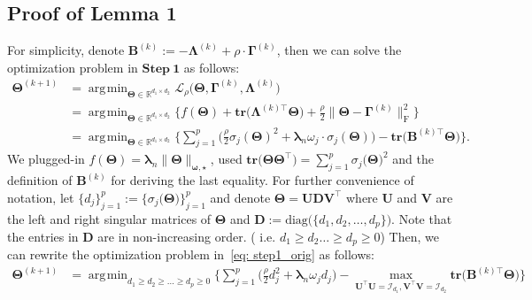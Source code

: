 \documentclass[alpha-refs]{wiley-article}
\DeclareMathOperator*{\argmin}{\arg\!\min}
\begin{document}
\subsection{Proof of Lemma 1}
For simplicity, denote $\boldsymbol{B}^{(k)}:=-\boldsymbol{\Lambda}^{(k)}+\rho \cdot \boldsymbol{\Gamma}^{(k)}$, then we can solve the optimization problem in $\textbf{Step}\ \boldsymbol{1}$ as follows:
\begin{align}
    \boldsymbol{\Theta}^{(k+1)}
    &= \argmin_{\boldsymbol{\Theta}\in\mathbb{R}^{d_{1} \times d_{2}}} \mathcal{L}_{\rho} \big( \boldsymbol{\Theta},\boldsymbol{\Gamma}^{(k)},\boldsymbol{\Lambda}^{(k)} \big) \nonumber \\
    &= \argmin_{\boldsymbol{\Theta}\in\mathbb{R}^{d_{1} \times d_{2}}}  \bigg\{ f(\boldsymbol{\Theta}) + \textbf{tr}\big(\boldsymbol{\Lambda}^{(k) \top}\boldsymbol{\Theta}\big) + \frac{\rho}{2} \| \boldsymbol{\Theta}-\boldsymbol{\Gamma}^{(k)} \|_{\text{F}}^{2} \bigg\}  \nonumber \\
    &= \argmin_{\boldsymbol{\Theta}\in\mathbb{R}^{d_{1} \times d_{2}}} \bigg\{ \sum_{j=1}^{p} \bigg( \frac{\rho}{2}\sigma_{j}(\boldsymbol{\Theta})^{2} + \boldsymbol{\lambda}_{n} \omega_{j} \cdot\sigma_{j}(\boldsymbol{\Theta}) \bigg) -\textbf{tr} \big( \boldsymbol{B}^{(k) \top}\boldsymbol{\Theta} \big) \bigg\} \label{eq: step1_orig}.
\end{align}
We plugged-in $f(\boldsymbol{\Theta})=\boldsymbol{\lambda}_{n}\|\boldsymbol{\Theta}\|_{\boldsymbol{\omega,\star}}$,
used $\textbf{tr}\big(\boldsymbol{\Theta}\boldsymbol{\Theta}^{\top}\big)=\sum_{j=1}^{p}\sigma_{j}\big(\boldsymbol{\Theta}\big)^{2}$ and the definition of $\boldsymbol{B}^{(k)}$ for deriving the last equality.
For further convenience of notation, let $\{d_{j}\}_{j=1}^{p}:=\{\sigma_{j}\big(\boldsymbol{\Theta}\big)\}_{j=1}^{p}$ and
denote $\boldsymbol{\Theta}=\boldsymbol{UDV^{\top}}$ where
$\boldsymbol{U}$ and $\boldsymbol{V}$ are the left and right singular matrices of $\boldsymbol{\Theta}$ and $\boldsymbol{D}:=\text{diag}\big(\{d_{1},d_{2},\dots,d_{p}\}\big)$.
Note that the entries in $\boldsymbol{D}$ are in non-increasing order. ( i.e. $d_{1} \geq d_{2} \dots \geq d_{p} \geq 0$)
Then, we can rewrite the optimization problem in~\eqref{eq: step1_orig} as follows:
\begin{align}
    \boldsymbol{\Theta}^{(k+1)}
    &= \argmin_{d_{1}\geq d_{2}\geq \dots \geq d_{p} \geq 0 }\bigg\{ \sum_{j=1}^{p} \bigg( \frac{\rho}{2} d_{j}^{2} + \boldsymbol{\lambda}_{n}\omega_{j}d_{j} \bigg) - \max_{\boldsymbol{U}^{\top}\boldsymbol{U} = \mathcal{I}_{d_{1}}, \boldsymbol{V}^{\top}\boldsymbol{V} = \mathcal{I}_{d_{2}}} \textbf{tr}\big(\boldsymbol{B}^{(k)\top}\boldsymbol{\Theta}\big) \bigg\} \label{eq: step1_sec}
\end{align}
\end{document}

